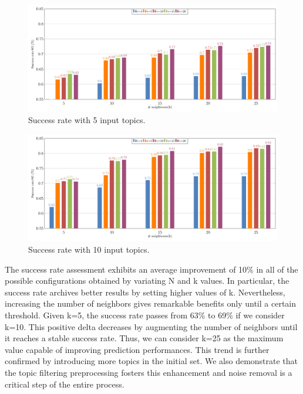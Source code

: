 \begin{figure}[t!]
	\centering
	\includegraphics[width=\linewidth]{figs/successRateN@5.pdf}
	\caption{Success rate with 5 input topics.}
	\label{fig:success5}
\end{figure}


\begin{figure}[t!]
	\centering
	\includegraphics[width=\linewidth]{figs/successRateN@10.pdf}
	\caption{Success rate with 10 input topics.}
	\label{fig:success10}
\end{figure}

The success rate assessment exhibits an average improvement of 10\% in all of the possible configurations obtained by variating N and k values. In particular, the success rate archives better results by setting higher values of k. Nevertheless, increasing the number of neighbors gives remarkable benefits only until a certain threshold. Given k=5, the success rate passes from 63\% to 69\% if we consider k=10. This positive delta decreases by augmenting the number of neighbors until it reaches a stable success rate. Thus, we can consider k=25 as the maximum value capable of improving prediction performances. This trend is further confirmed by introducing more topics in the initial set. We also demonstrate that the topic filtering preprocessing fosters this enhancement and noise removal is a critical step of the entire process.



